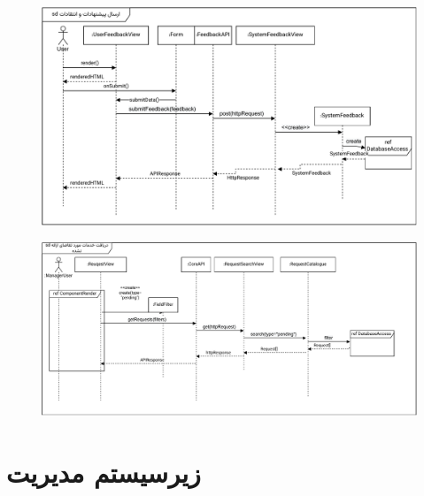 \begin{figure}[ht!]
	\centering
	\includegraphics[scale=0.8]{figs/design-sequence/3-30.pdf}
\end{figure}

\FloatBarrier
\newpage

\eject \pdfpagewidth=10in \pdfpageheight=9in

\begin{figure}[ht!]
	\centering
	\includegraphics[scale=0.8]{figs/design-sequence/3-35.pdf}
\end{figure}

\FloatBarrier
\newpage

\section{زیرسیستم مدیریت}

\eject \pdfpagewidth=13in \pdfpageheight=9in

